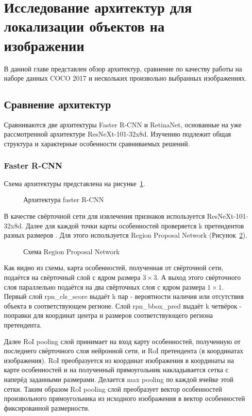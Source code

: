 \newpage
\section{Исследование архитектур для локализации объектов на изображении}
В данной главе представлен обзор архитектур, сравнение по качеству работы на наборе данных COCO 2017 и нескольких произвольно выбранных изображениях.

\subsection{Сравнение архитектур}
Сравниваются две архитектуры Faster R-CNN и RetinaNet, основанные на уже рассмотренной архитектуре ResNeXt-101-32x8d. Изучению подлежит общая структура и характерные особенности сравниваемых решений.

\subsubsection{Faster R-CNN}
Схема архитектуры представлена на рисунке~\ref{faster_rcnn}.

\begin{figure}[H]
	\caption{Архитектура faster R-CNN}
	\label{faster_rcnn}
\end{figure}

В качестве свёрточной сети для извлечения признаков используется ResNeXt-101-32x8d. Далее для каждой точки карты особенностей проверяется k претендентов разных размеров \cite{fasterrcnn}. Для этого используется Region Proposal Network (Рисунок~\ref{rpn}).

\begin{figure}[H]
	\caption{Схема Region Proposal Network}
	\label{rpn}
\end{figure}

Как видно из схемы, карта особенностей, полученная от свёрточной сети, подаётся на свёрточный слой с ядром размера $3\times3$. А выход этого свёрточного слоя параллельно подаётся на два свёрточных слоя с ядром размера $1\times1$. Первый слой rpn\_cls\_score выдаёт k пар - вероятности наличия или отсутствия объекта в соответствующем регионе. Слой rpn\_bbox\_pred выдаёт k четвёрок - поправки для координат центра и размеров соответствующего региона претендента. 

Далее RoI pooling слой принимает на вход карту особенностей, полученную от последнего свёрточного слоя нейронной сети, и RoI претендента (в координатах изображения). RoI преобразуется из координат изображения в координаты на карте особенностей и на полученный прямоугольник накладывается сетка с наперёд заданными размерами. Делается max pooling по каждой ячейке этой сетки. Таким образом RoI pooling слой преобразует вектор особенностей произвольного прямоугольника из исходного изображения в вектор особенностей фиксированной размерности.

